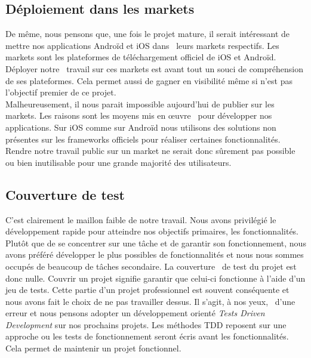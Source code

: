 \subsection{Déploiement dans les markets}

De même, nous pensons que, une fois le projet mature, il serait intéressant de mettre nos applications Androïd et iOS dans 
leurs markets respectifs. Les markets sont les plateformes de téléchargement officiel de iOS et Androïd. Déployer notre 
travail sur ces markets est avant tout un souci de compréhension de ses plateformes. Cela permet aussi de gagner en visibilité
même si n'est pas l'objectif premier de ce projet.
\\
Malheureusement, il nous parait impossible aujourd'hui de publier sur les markets. Les raisons sont les moyens mis en œuvre 
pour développer nos applications. Sur iOS comme sur Androïd nous utilisons des solutions non présentes sur les frameworks officiels
pour réaliser certaines fonctionnalités. Rendre notre travail public sur un market ne serait donc sûrement pas possible ou bien
inutilisable pour une grande majorité des utilisateurs.




\subsection{Couverture de test}

C'est clairement le maillon faible de notre travail. Nous avons privilégié le développement rapide pour atteindre nos objectifs
primaires, les fonctionnalités. Plutôt que de se concentrer sur une tâche et de garantir son fonctionnement, nous avons préféré
développer le plus possibles de fonctionnalités et nous nous sommes occupés de beaucoup de tâches secondaire. La couverture 
de test du projet est donc nulle. Couvrir un projet signifie garantir que celui-ci fonctionne à l'aide d'un jeu de tests. Cette partie
d'un projet professionnel est souvent conséquente et nous avons fait le choix de ne pas travailler dessus. Il s'agit, à nos yeux, 
d'une erreur et nous pensons adopter un développement orienté \textit{Tests Driven Development} sur nos prochains projets. Les méthodes
TDD reposent sur une approche ou les tests de fonctionnement seront écris avant les fonctionnalités. Cela permet de maintenir un projet
fonctionnel.



